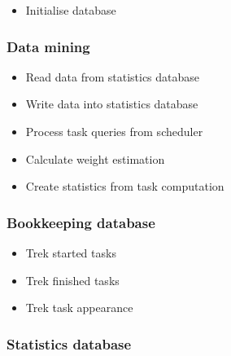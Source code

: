 {		\begin{itemize}
			\item Initialise database
		\end{itemize}
		
		\subsubsection{Data mining}
	
			\begin{itemize}
				\item Read data from statistics database
				\item Write data into statistics database
				\item Process task queries from scheduler
				\item Calculate weight estimation 
				\item Create statistics from task computation
			\end{itemize}
	
	
		
		
		\subsubsection{Bookkeeping database}
	
			\begin{itemize}
				\item Trek started tasks
				\item Trek finished tasks
				\item Trek task appearance 
			\end{itemize}
	
		\subsubsection{Statistics database}
	
}
